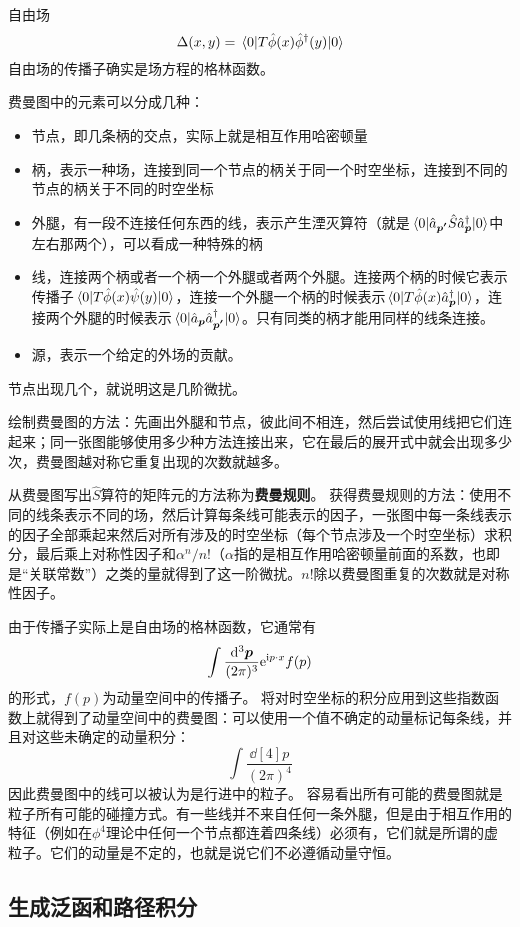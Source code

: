 \documentclass[hyperref, UTF8, a4paper]{ctexart}
\newcommand*{\ii}{\mathrm{i}}
\newcommand*{\ee}{\mathrm{e}}
\begin{document}
自由场
\begin{equation}
    \Delta (x, y) = \mel{0}{T \hat{\phi} (x) \hat{\phi}^\dagger(y) }{0}
\end{equation}
自由场的传播子确实是场方程的格林函数。

费曼图中的元素可以分成几种：
\begin{itemize}
    \item 节点，即几条柄的交点，实际上就是相互作用哈密顿量
    \item 柄，表示一种场，连接到同一个节点的柄关于同一个时空坐标，连接到不同的节点的柄关于不同的时空坐标
    \item 外腿，有一段不连接任何东西的线，表示产生湮灭算符（就是$\mel{0}{\hat{a}_{\vb*{p'}}\hat{S}\hat{a}^\dagger_{\vb*{p}}}{0}$中左右那两个），可以看成一种特殊的柄
    \item 线，连接两个柄或者一个柄一个外腿或者两个外腿。连接两个柄的时候它表示传播子$\mel{0}{T\hat{\phi}(x)\hat{\psi}(y)}{0}$，连接一个外腿一个柄的时候表示$\mel{0}{T\hat{\phi}(x)\hat{a}^\dagger_{\vb*{p}}}{0}$，连接两个外腿的时候表示$\mel{0}{\hat{a}_{\vb*{p}}\hat{a}^\dagger_{\vb*{p'}}}{0}$。只有同类的柄才能用同样的线条连接。
    \item 源，表示一个给定的外场的贡献。
\end{itemize}
节点出现几个，就说明这是几阶微扰。

绘制费曼图的方法：先画出外腿和节点，彼此间不相连，然后尝试使用线把它们连起来；同一张图能够使用多少种方法连接出来，它在最后的展开式中就会出现多少次，费曼图越对称它重复出现的次数就越多。

从费曼图写出$\hat{S}$算符的矩阵元的方法称为\textbf{费曼规则}。
获得费曼规则的方法：使用不同的线条表示不同的场，然后计算每条线可能表示的因子，一张图中每一条线表示的因子全部乘起来然后对所有涉及的时空坐标（每个节点涉及一个时空坐标）求积分，最后乘上对称性因子和$\alpha^n/n!$（$\alpha$指的是相互作用哈密顿量前面的系数，也即是“关联常数”）之类的量就得到了这一阶微扰。$n!$除以费曼图重复的次数就是对称性因子。

由于传播子实际上是自由场的格林函数，它通常有
\[
    \int \frac{\dd[3]{\vb*{p}}}{(2\pi)^3} \ee^{\ii p \cdot x} f(p)
\]
的形式，$f(p)$为动量空间中的传播子。
将对时空坐标的积分应用到这些指数函数上就得到了动量空间中的费曼图：可以使用一个值不确定的动量标记每条线，并且对这些未确定的动量积分：
\[
    \int \frac{\dd[4]p}{(2\pi)^4}
\]
因此费曼图中的线可以被认为是行进中的粒子。
容易看出所有可能的费曼图就是粒子所有可能的碰撞方式。有一些线并不来自任何一条外腿，但是由于相互作用的特征（例如在$\phi^4$理论中任何一个节点都连着四条线）必须有，它们就是所谓的虚粒子。它们的动量是不定的，也就是说它们不必遵循动量守恒。

\subsection{生成泛函和路径积分}

\end{document}
